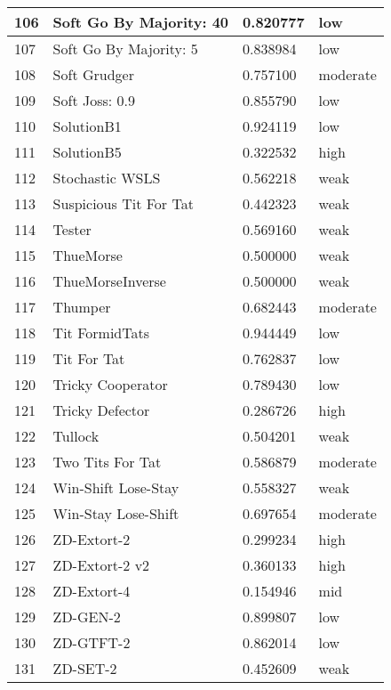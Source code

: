 \begin{longtable}{|p{0.5cm}||p{6cm}||p{4cm}||p{2cm}|}
			106 & Soft Go By Majority: 40     & 0.820777          & low      \\ \hline
			107 & Soft Go By Majority: 5      & 0.838984          & low      \\ \hline
			108 & Soft Grudger                & 0.757100          & moderate \\ \hline
			109 & Soft Joss: 0.9              & 0.855790          & low      \\ \hline
			110 & SolutionB1                  & 0.924119          & low      \\ \hline
			111 & SolutionB5                  & 0.322532          & high     \\ \hline
			112 & Stochastic WSLS             & 0.562218          & weak     \\ \hline
			113 & Suspicious Tit For Tat      & 0.442323          & weak     \\ \hline
			114 & Tester                      & 0.569160          & weak     \\ \hline
			115 & ThueMorse                   & 0.500000          & weak     \\ \hline
			116 & ThueMorseInverse            & 0.500000          & weak     \\ \hline
			117 & Thumper                     & 0.682443          & moderate \\ \hline
			118 & Tit FormidTats              & 0.944449          & low      \\ \hline
			119 & Tit For Tat                 & 0.762837          & low      \\ \hline
			120 & Tricky Cooperator           & 0.789430          & low      \\ \hline
			121 & Tricky Defector             & 0.286726          & high     \\ \hline
			122 & Tullock                     & 0.504201          & weak     \\ \hline
			123 & Two Tits For Tat            & 0.586879          & moderate \\ \hline
			124 & Win-Shift Lose-Stay         & 0.558327          & weak     \\ \hline
			125 & Win-Stay Lose-Shift         & 0.697654          & moderate \\ \hline
			126 & ZD-Extort-2                 & 0.299234          & high     \\ \hline
			127 & ZD-Extort-2 v2              & 0.360133          & high     \\ \hline
			128 & ZD-Extort-4                 & 0.154946          & mid      \\ \hline
			129 & ZD-GEN-2                    & 0.899807          & low      \\ \hline
			130 & ZD-GTFT-2                   & 0.862014          & low      \\ \hline
			131 & ZD-SET-2                    & 0.452609          & weak     \\ \hline
		\end{longtable}

